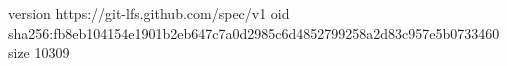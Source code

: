 version https://git-lfs.github.com/spec/v1
oid sha256:fb8eb104154e1901b2eb647c7a0d2985c6d4852799258a2d83c957e5b0733460
size 10309
